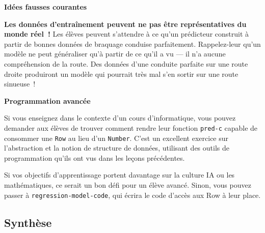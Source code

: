 \documentclass[12pt,a4paper]{article}
\begin{document}
\begin{instructornotes}
  \textbf{Idées fausses courantes}

  \textbf{Les données d'entraînement peuvent ne pas être représentatives du monde réel~!} Les élèves peuvent s'attendre à ce qu'un prédicteur construit à partir de bonnes données de braquage conduise parfaitement. Rappelez-leur qu'un modèle ne peut généraliser qu'à partir de ce qu'il a vu — il n'a aucune compréhension de la route. Des données d'une conduite parfaite sur une route droite produiront un modèle qui pourrait très mal s'en sortir sur une route sinueuse~!

  \vspace{0.3em}
  \textbf{Programmation avancée}

  Si vous enseignez dans le contexte d'un cours d'informatique, vous pouvez demander aux élèves de trouver comment rendre leur fonction \texttt{pred-c} capable de consommer une \texttt{Row} au lieu d'un \texttt{Number}. C'est un excellent exercice sur l'abstraction et la notion de structure de données, utilisant des outils de programmation qu'ils ont vus dans les leçons précédentes.

  Si vos objectifs d'apprentissage portent davantage sur la culture IA ou les mathématiques, ce serait un bon défi pour un élève avancé. Sinon, vous pouvez passer à \texttt{regression-model-code}, qui écrira le code d'accès aux Row à leur place.
\end{instructornotes}

\subsection{Synthèse}
\end{document}
